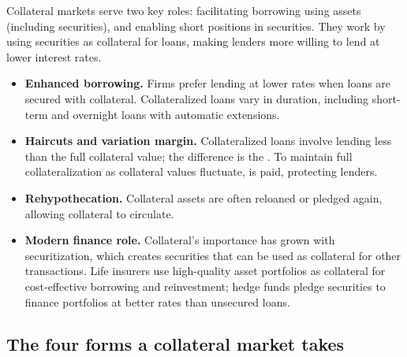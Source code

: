 
Collateral markets serve two key roles: facilitating borrowing using assets (including securities), and enabling short positions in securities. They work by using securities as collateral for loans, making lenders more willing to lend at lower interest rates.

\begin{lrkeybox}
\begin{itemize}
\item \textbf{Enhanced borrowing.} Firms prefer lending at lower rates when loans are secured with collateral. Collateralized loans vary in duration, including short-term and overnight loans with automatic extensions.
\item \textbf{Haircuts and variation margin.} Collateralized loans involve lending less than the full collateral value; the difference is the . To maintain full collateralization as collateral values fluctuate,  is paid, protecting lenders.
\item \textbf{Rehypothecation.} Collateral assets are often reloaned or pledged again, allowing collateral to circulate.
\item \textbf{Modern finance role.} Collateral's importance has grown with securitization, which creates securities that can be used as collateral for other transactions. Life insurers use high-quality asset portfolios as collateral for cost-effective borrowing and reinvestment; hedge funds pledge securities to finance portfolios at better rates than unsecured loans.
\end{itemize}
\end{lrkeybox}

\subsection{The four forms a collateral market takes}

